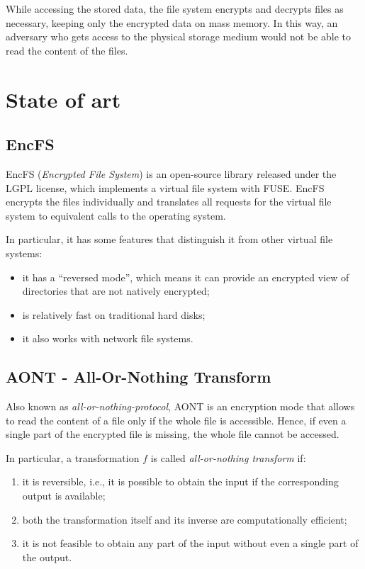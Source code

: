 \documentclass[a4paper,12pt,twoside,openright]{report}
\begin{document}
  While accessing the stored data, the file system encrypts and decrypts files as necessary, keeping only
  the encrypted data on mass memory. In this way, an adversary who gets access to the physical storage medium
  would not be able to read the content of the files.

  \section{State of art}
  \subsection{EncFS}
  EncFS (\textit{Encrypted File System}) \cite{encfsgithub} is an open-source library
  released under the LGPL license, which implements a virtual file system with FUSE.
  EncFS encrypts the files individually and translates all requests for the virtual file system to equivalent
  calls to the operating system.

  In particular, it has some features that distinguish it from other virtual file systems:
  \begin{itemize}
    \item it has a ``reversed mode'', which means it can provide an encrypted view of directories that are not natively encrypted;
    \item is relatively fast on traditional hard disks;
    \item it also works with network file systems.
  \end{itemize}

  \subsection{AONT - All-Or-Nothing Transform}
  Also known as \textit{all-or-nothing-protocol}, AONT \cite{aontpaper} is an encryption mode that
  allows to read the content of a file only if the whole file is accessible.
  Hence, if even a single part of the encrypted file is missing, the whole file cannot be accessed.

  In particular, a transformation $f$ is called \textit{all-or-nothing transform} if:
  \begin{enumerate}
    \item it is reversible, i.e., it is possible to obtain the input if the corresponding output is available;
    \item both the transformation itself and its inverse are computationally efficient;
    \item it is not feasible to obtain any part of the input without even a single part of the output.
  \end{enumerate}
\end{document}
